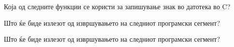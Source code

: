 \documentclass[11pt]{examdesign}
\begin{document}
\begin{multiplechoice}[title={},suppressprefix=yes,rearrange=no]
\begin{question}
Која од следните функции се користи за запишување знак во датотека во C?
\end{question}

\begin{question}

Што ќе биде излезот од извршувањето на следниот програмски сегмент?
\end{question}
  
\begin{question}
Што ќе биде излезот од извршувањето на следниот програмски сегмент?
\end{question}

\end{multiplechoice}
\end{document}
